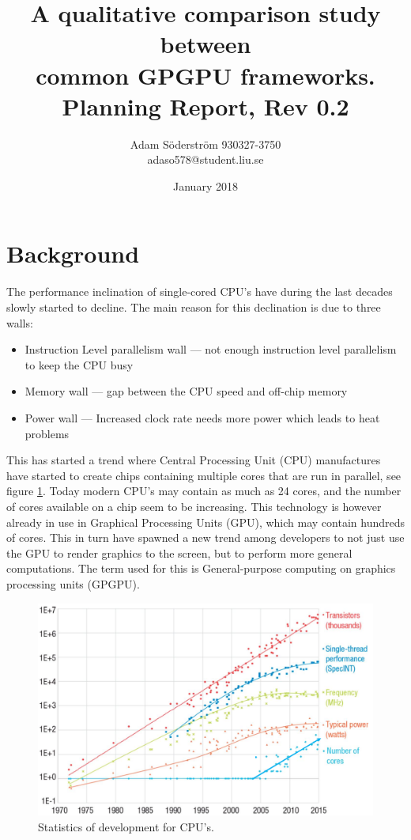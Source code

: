 \documentclass{article}
\title{%
  A qualitative comparison study between \\  
  common GPGPU frameworks. \\
  \large Planning Report, Rev 0.2 \\
}
\author{
    Adam Söderström 930327-3750 \\
    adaso578@student.liu.se 
}
\date{January 2018}
\begin{document}
\maketitle

\section{Background}
The performance inclination of single-cored CPU's have during the last decades slowly started to decline. The main reason for this declination is due to three walls:

\begin{itemize}
    \item Instruction Level parallelism wall --- not enough instruction level parallelism to keep the CPU busy
    \item Memory wall --- gap between the CPU speed and off-chip memory
    \item Power wall --- Increased clock rate needs more power which leads to heat problems
\end{itemize}

\noindent This has started a trend where Central Processing Unit (CPU) manufactures have started to create chips containing multiple cores that are run in parallel, see figure \ref{fig:cpuStats}. Today modern CPU's may contain as much as 24 cores, and the number of cores available on a chip seem to be increasing. This technology is however already in use in Graphical Processing Units (GPU), which may contain hundreds of cores. This in turn have spawned a new trend among developers to not just use the GPU to render graphics to the screen, but to perform more general computations. The term used for this is General-purpose computing on graphics processing units (GPGPU).

\begin{figure}[!h]
    \centering
    \includegraphics[width=12cm]{Figs/CPUStats.png}
    \caption{Statistics of development for CPU's. \cite{CPUStats}}
    \label{fig:cpuStats}
\end{figure}
\end{document}

